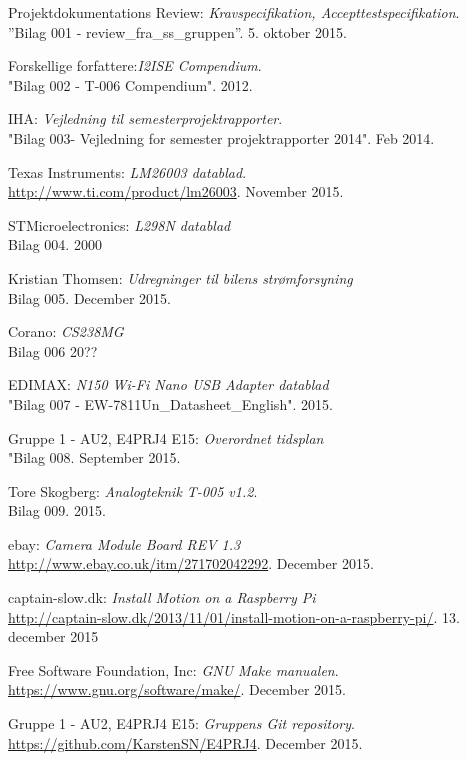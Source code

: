 	\fancyhead[CE,CO]{}
\renewcommand{\bibname}{Litteraturliste}
\begin{thebibliography}{2}

 Projektdokumentations Review: \textit{Kravspecifikation, Accepttestspecifikation}.\\
''Bilag 001 - review\_fra\_ss\_gruppen''. 5. oktober 2015.

 Forskellige forfattere:\textit{I2ISE Compendium}. \\
"Bilag 002 - T-006 Compendium". 2012.

 IHA: \textit{Vejledning til semesterprojektrapporter}. \\
"Bilag 003- Vejledning for semester projektrapporter 2014". Feb 2014.

 Texas Instruments: \textit{LM26003 datablad}. \\
\url{http://www.ti.com/product/lm26003}. November 2015.

 STMicroelectronics: \textit{L298N datablad} \\
Bilag 004. 2000

 Kristian Thomsen: \textit{Udregninger til bilens strømforsyning} \\
Bilag 005. December 2015.

 Corano: \textit{CS238MG}\\
Bilag 006 20??

 EDIMAX: \textit{N150 Wi-Fi Nano USB Adapter datablad} \\
"Bilag 007 - EW-7811Un\_Datasheet\_English". 2015.

 Gruppe 1 - AU2, E4PRJ4 E15: \textit{Overordnet tidsplan} \\
"Bilag 008. September 2015.

 Tore Skogberg: \textit{Analogteknik T-005 v1.2}.\\
Bilag 009. 2015.

 ebay: \textit{Camera Module Board REV 1.3} \\
\url{http://www.ebay.co.uk/itm/271702042292}. December 2015.

captain-slow.dk: \textit{Install Motion on a Raspberry Pi} \\
\url{http://captain-slow.dk/2013/11/01/install-motion-on-a-raspberry-pi/}. 13. december 2015

 Free Software Foundation, Inc: \textit{GNU Make manualen}. \\
\url{https://www.gnu.org/software/make/}. December 2015.

 Gruppe 1 - AU2, E4PRJ4 E15: \textit{Gruppens Git repository}. \\
\url{https://github.com/KarstenSN/E4PRJ4}. December 2015.

\end{thebibliography}